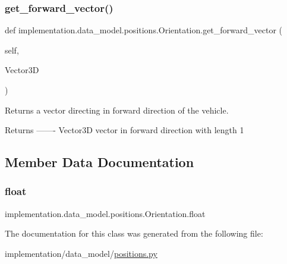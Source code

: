 \subsubsection{\texorpdfstring{get\+\_\+forward\+\_\+vector()}{get\_forward\_vector()}}
{\footnotesize\ttfamily def implementation.\+data\+\_\+model.\+positions.\+Orientation.\+get\+\_\+forward\+\_\+vector (\begin{DoxyParamCaption}\item[{}]{self,  }\item[{}]{Vector3D }\end{DoxyParamCaption})}

\begin{DoxyVerb}Returns a vector directing in forward direction of the vehicle.

Returns
-------
Vector3D
    vector in forward direction with length 1
\end{DoxyVerb}
 

\subsection{Member Data Documentation}
\mbox{\label{classimplementation_1_1data__model_1_1positions_1_1_orientation_ab6e44ad9fcf49a139d793cdfa4009005}} 
\subsubsection{\texorpdfstring{float}{float}}
{\footnotesize\ttfamily implementation.\+data\+\_\+model.\+positions.\+Orientation.\+float\hspace{0.3cm}{\ttfamily [static]}}



The documentation for this class was generated from the following file\+:\begin{DoxyCompactItemize}
\item 
implementation/data\+\_\+model/\hyperlink{positions_8py}{positions.\+py}\end{DoxyCompactItemize}
